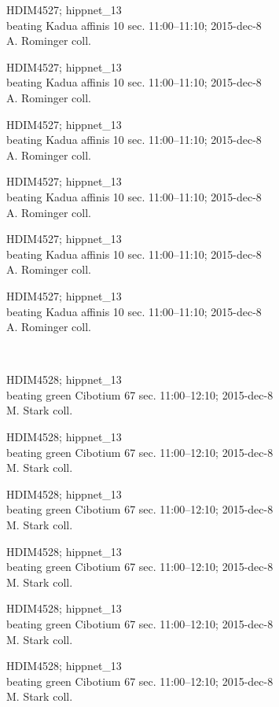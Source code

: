 \documentclass[2pt]{extarticle}
\begin{document}
\noindent
\parbox{0.16\textwidth}{\tiny \raggedright \rule[-0.3\baselineskip]{0pt}{10pt}HDIM4527; hippnet\_13\\ beating Kadua affinis 10 sec. 11:00--11:10; 2015-dec-8\\ A. Rominger coll.}
\parbox{0.16\textwidth}{\tiny \raggedright \rule[-0.3\baselineskip]{0pt}{10pt}HDIM4527; hippnet\_13\\ beating Kadua affinis 10 sec. 11:00--11:10; 2015-dec-8\\ A. Rominger coll.}
\parbox{0.16\textwidth}{\tiny \raggedright \rule[-0.3\baselineskip]{0pt}{10pt}HDIM4527; hippnet\_13\\ beating Kadua affinis 10 sec. 11:00--11:10; 2015-dec-8\\ A. Rominger coll.}
\parbox{0.16\textwidth}{\tiny \raggedright \rule[-0.3\baselineskip]{0pt}{10pt}HDIM4527; hippnet\_13\\ beating Kadua affinis 10 sec. 11:00--11:10; 2015-dec-8\\ A. Rominger coll.}
\parbox{0.16\textwidth}{\tiny \raggedright \rule[-0.3\baselineskip]{0pt}{10pt}HDIM4527; hippnet\_13\\ beating Kadua affinis 10 sec. 11:00--11:10; 2015-dec-8\\ A. Rominger coll.}
\parbox{0.16\textwidth}{\tiny \raggedright \rule[-0.3\baselineskip]{0pt}{10pt}HDIM4527; hippnet\_13\\ beating Kadua affinis 10 sec. 11:00--11:10; 2015-dec-8\\ A. Rominger coll.} \\ 
\vspace{0.001in} 

\noindent
\parbox{0.16\textwidth}{\tiny \raggedright \rule[-0.3\baselineskip]{0pt}{10pt}HDIM4528; hippnet\_13\\ beating green Cibotium 67 sec. 11:00--12:10; 2015-dec-8\\ M. Stark coll.}
\parbox{0.16\textwidth}{\tiny \raggedright \rule[-0.3\baselineskip]{0pt}{10pt}HDIM4528; hippnet\_13\\ beating green Cibotium 67 sec. 11:00--12:10; 2015-dec-8\\ M. Stark coll.}
\parbox{0.16\textwidth}{\tiny \raggedright \rule[-0.3\baselineskip]{0pt}{10pt}HDIM4528; hippnet\_13\\ beating green Cibotium 67 sec. 11:00--12:10; 2015-dec-8\\ M. Stark coll.}
\parbox{0.16\textwidth}{\tiny \raggedright \rule[-0.3\baselineskip]{0pt}{10pt}HDIM4528; hippnet\_13\\ beating green Cibotium 67 sec. 11:00--12:10; 2015-dec-8\\ M. Stark coll.}
\parbox{0.16\textwidth}{\tiny \raggedright \rule[-0.3\baselineskip]{0pt}{10pt}HDIM4528; hippnet\_13\\ beating green Cibotium 67 sec. 11:00--12:10; 2015-dec-8\\ M. Stark coll.}
\parbox{0.16\textwidth}{\tiny \raggedright \rule[-0.3\baselineskip]{0pt}{10pt}HDIM4528; hippnet\_13\\ beating green Cibotium 67 sec. 11:00--12:10; 2015-dec-8\\ M. Stark coll.} \\ 
\vspace{0.001in} 
\end{document}
